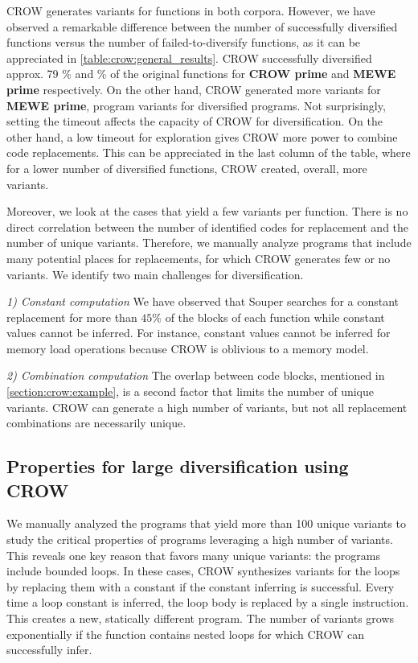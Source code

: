 CROW generates variants for functions in both corpora. However, we have observed a remarkable difference between the number of successfully diversified functions versus the number of failed-to-diversify functions, as it can be appreciated in \autoref{table:crow:general_results}. CROW successfully diversified approx. 79 \% and \% of the original functions for \textbf{CROW prime} and  \textbf{MEWE prime} respectively. On the other hand, CROW generated more variants for \textbf{MEWE prime}, \py{\allmewepopulation} program variants for \py{\allmewediversified} diversified programs. Not surprisingly, setting the timeout affects the capacity of CROW for diversification. On the other hand, a low timeout for exploration gives CROW more power to combine code replacements. This can be appreciated in the last column of the table, where for a lower number of diversified functions, CROW created, overall, more variants.



Moreover, we look at the cases that yield a few variants per function. There is no direct correlation between the number of identified codes for replacement and the number of unique variants. Therefore, we manually analyze programs that include many potential places for replacements, for which CROW generates few or no variants. 
We identify two main challenges for diversification.

\emph{1) Constant computation}  We have observed that Souper searches for a constant replacement for more than $45\%$ of the blocks of each function while constant values cannot be inferred. For instance,  constant values cannot be inferred for memory load operations because CROW is oblivious to a memory model. 


\emph{2) Combination computation}  The overlap between code blocks, mentioned in \autoref{section:crow:example}, is a second factor that limits the number of unique variants. CROW can generate a high number of variants, but not all replacement combinations are necessarily unique. 



\subsection{Properties for large diversification using CROW}

We manually analyzed the programs that yield more than 100 unique variants to study the critical properties of programs leveraging a high number of variants.
This reveals one key reason that favors many unique variants: the programs include bounded loops. In these cases, CROW synthesizes variants for the loops by replacing them with a constant if the constant inferring is successful. Every time a loop constant is inferred, the loop body is replaced by a single instruction. This creates a new, statically different program. The number of variants grows exponentially if the function contains nested loops for which CROW can successfully infer. 


